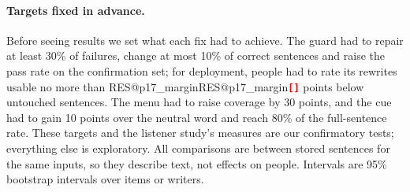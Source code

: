 \documentclass[letterpaper]{article} %
\makeatletter
\newcommand{\RES}[1]{\ifcsname RES@#1\endcsname\csname RES@#1\endcsname\else\RESmissing{#1}\fi}
\newcommand{\RESmissing}[1]{\textcolor{red}{\textbf{\texttt{[\detokenize{#1}]}}}}
\makeatother
\begin{document}
\paragraph{Targets fixed in advance.}
Before seeing results we set what each fix had to achieve.
The guard had to repair at least 30\% of failures, change at most 10\% of correct sentences and raise the pass rate on the confirmation set; for deployment, people had to rate its rewrites usable no more than \RES{p17_margin} points below untouched sentences.
The menu had to raise coverage by 30 points, and the cue had to gain 10 points over the neutral word and reach 80\% of the full-sentence rate.
These targets and the listener study's measures are our confirmatory tests; everything else is exploratory.
All comparisons are between stored sentences for the same inputs, so they describe text, not effects on people.
Intervals are 95\% bootstrap intervals over items or writers.

\end{document}
